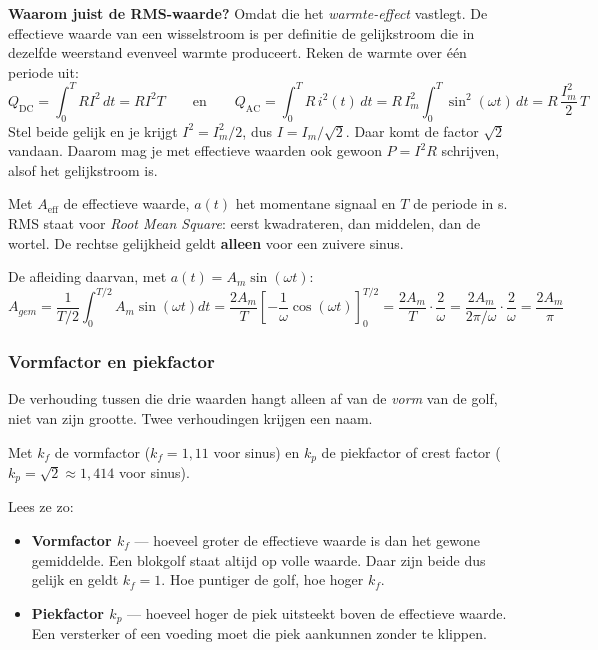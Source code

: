 \documentclass[a4paper,11pt]{article}
\begin{document}
\textbf{Waarom juist de RMS-waarde?} Omdat die het \emph{warmte-effect} vastlegt. De effectieve
waarde van een wisselstroom is per definitie de gelijkstroom die in dezelfde weerstand evenveel
warmte produceert. Reken de warmte over één periode uit:
\[Q_{\text{DC}} = \int_0^T R I^2\,dt = R I^2 T
    \qquad\text{en}\qquad
    Q_{\text{AC}} = \int_0^T R\,i^2(t)\,dt = R\,I_m^2 \int_0^T \sin^2(\omega t)\,dt = R\,\frac{I_m^2}{2}\,T\]
Stel beide gelijk en je krijgt $I^2 = I_m^2/2$, dus $I = I_m/\sqrt2$. Daar komt de factor $\sqrt2$
vandaan. Daarom mag je met effectieve waarden ook gewoon $P = I^2R$ schrijven, alsof het
gelijkstroom is.

{Met $A_{\text{eff}}$ de effectieve waarde, $a(t)$ het momentane signaal en $T$ de periode in s.
    RMS staat voor \emph{Root Mean Square}: eerst kwadrateren, dan middelen, dan de wortel.
    De rechtse gelijkheid geldt \textbf{alleen} voor een zuivere sinus.}


De afleiding daarvan, met $a(t) = A_m \sin(\omega t)$:
\[A_{gem} = \frac{1}{T/2} \int_0^{T/2} A_m \sin(\omega t) dt = \frac{2 A_m}{T} \left[ -\frac{1}{\omega} \cos(\omega t)
        \right]_0^{T/2} = \frac{2 A_m}{T} \cdot \frac{2}{\omega} = \frac{2 A_m}{2\pi / \omega} \cdot \frac{2}{\omega} = \frac{2 A_m}{\pi}\]

\subsubsection{Vormfactor en piekfactor}

De verhouding tussen die drie waarden hangt alleen af van de \emph{vorm} van de golf, niet van zijn
grootte. Twee verhoudingen krijgen een naam.

{Met $k_f$ de vormfactor ($k_f = 1{,}11$ voor sinus) en $k_p$ de piekfactor of crest factor ($k_p = \sqrt{2} \approx 1{,}414$ voor sinus).}

Lees ze zo:
\begin{itemize}
    \item \textbf{Vormfactor $k_f$} --- hoeveel groter de effectieve waarde is dan het gewone
          gemiddelde. Een blokgolf staat altijd op volle waarde. Daar zijn beide dus gelijk en geldt
          $k_f = 1$. Hoe puntiger de golf, hoe hoger $k_f$.
    \item \textbf{Piekfactor $k_p$} --- hoeveel hoger de piek uitsteekt boven de effectieve waarde.
          Een versterker of een voeding moet die piek aankunnen zonder te klippen.
\end{itemize}
\end{document}
